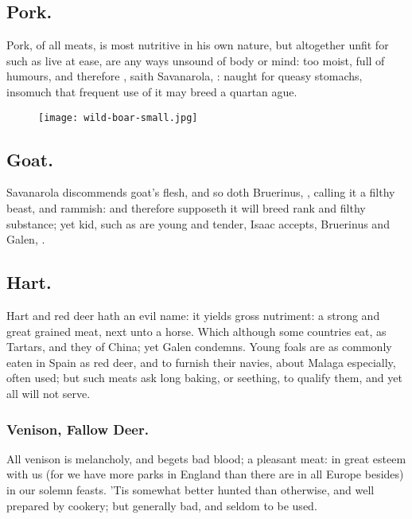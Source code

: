 \subsection{Pork.}
Pork, of all meats, is most nutritive in his own nature,
but altogether unfit for such as live at ease, are any
ways unsound of body or mind: too moist, full of humours, and therefore
, saith Savanarola, : naught for queasy stomachs, insomuch that frequent use of
it may breed a quartan ague.

\begin{figure}[H]
  \begingroup
  \centering
  \texttt{[image: wild-boar-small.jpg]}
  \label{fig:wildboar}
\end{figure}

\subsection{Goat.}
Savanarola discommends goat's flesh, and so doth
Bruerinus, , calling it
a filthy beast, and rammish: and therefore supposeth it will breed rank and
filthy substance; yet kid, such as are young and tender, Isaac accepts,
Bruerinus and Galen, .

\subsection{Hart.}
Hart and red deer hath an evil name: it yields gross
nutriment: a strong and great grained meat, next unto a horse. Which although
some countries eat, as Tartars, and they of China; yet
Galen condemns. Young foals are as commonly eaten in Spain
as red deer, and to furnish their navies, about Malaga especially, often used;
but such meats ask long baking, or seething, to qualify them, and yet all will
not serve.

\subsubsection{Venison, Fallow Deer.} All venison is melancholy, and begets bad
blood; a pleasant meat: in great esteem with us (for we have more parks in
England than there are in all Europe besides) in our solemn feasts. 'Tis
somewhat better hunted than otherwise, and well prepared by cookery; but
generally bad, and seldom to be used.

